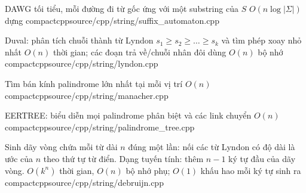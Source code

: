 {DAWG tối tiểu, mỗi đường đi từ gốc ứng với một substring của $S$}
{$O(n\log |\Sigma|)$ dựng}
{compactcpp}{source/cpp/string/suffix_automaton.cpp}

{Duval: phân tích chuỗi thành từ Lyndon $s_1 \ge s_2 \ge \dots \ge s_k$ và tìm phép xoay nhỏ nhất}
{$O(n)$ thời gian; các đoạn trả về/chuỗi nhân đôi dùng $O(n)$ bộ nhớ}
{compactcpp}{source/cpp/string/lyndon.cpp}

{Tìm bán kính palindrome lớn nhất tại mỗi vị trí}
{$O(n)$}
{compactcpp}{source/cpp/string/manacher.cpp}

{EERTREE: biểu diễn mọi palindrome phân biệt và các link chuyển}
{$O(n)$}
{compactcpp}{source/cpp/string/palindrome_tree.cpp}

{Sinh dãy vòng chứa mỗi từ dài $n$ đúng một lần: nối các từ Lyndon có độ dài là ước của $n$ theo thứ tự từ điển. Dạng tuyến tính: thêm $n-1$ ký tự đầu của dãy vòng.}
{$O(k^n)$ thời gian, $O(n)$ bộ nhớ phụ; $O(1)$ khấu hao mỗi ký tự sinh ra}
{compactcpp}{source/cpp/string/debruijn.cpp}
